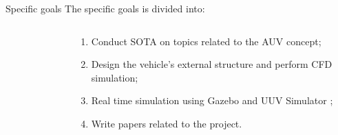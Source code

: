    
\begin{frame}[c]{Specific goals}
  The specific goals is divided into:

  \begin{columns}[t]
      \begin{center}
        \begin{figure}
        \end{figure}
      \end{center}       
    \begin{center}
      \begin{enumerate}
        \item Conduct SOTA on topics related to the  AUV concept; 
        \item Design the vehicle's external structure and perform CFD simulation; 
        \item Real time simulation using Gazebo and UUV Simulator \cite{7761080}; 
        \item Write papers related to the project.
      \end{enumerate}   
    \end{center}
  \end{columns}
\end{frame}
